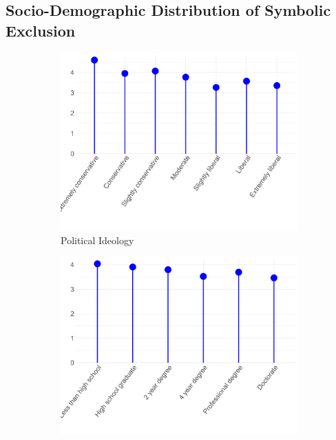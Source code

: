 \documentclass[12pt]{article}
\begin{document}
\subsection*{Socio-Demographic Distribution of Symbolic Exclusion}
\begin{figure}[ht!]
    \captionsetup[subfigure]{font=footnotesize,labelfont=footnotesize}
    \centering
     \begin{subfigure}[b]{0.3\textwidth}
        \includegraphics[width=1.0\textwidth]{Plots/uni-dist-grd-int-pol.png}
            \caption{Political Ideology}
            \label{fig:grd-int-pol}
    \end{subfigure}
     \begin{subfigure}[b]{0.3\textwidth}
        \includegraphics[width=1.0\textwidth]{Plots/uni-dist-grd-int-edu.png}

\end{subfigure}
\end{figure}
\end{document}
